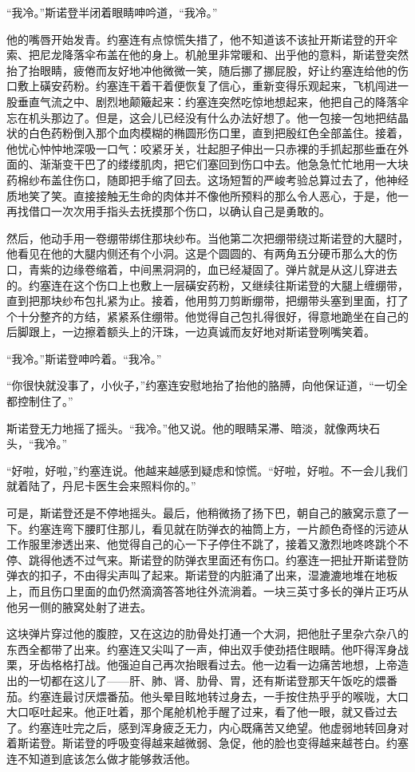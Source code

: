     “我冷。”斯诺登半闭着眼睛呻吟道，“我冷。”

    他的嘴唇开始发青。约塞连有点惊慌失措了，他不知道该不该扯开斯诺登的开伞索、把尼龙降落伞布盖在他的身上。机舱里非常暖和、出乎他的意料，斯诺登突然抬了抬眼睛，疲倦而友好地冲他微微一笑，随后挪了挪屁股，好让约塞连给他的伤口敷上磺安药粉。约塞连干着干着便恢复了信心，重新变得乐观起来，飞机闯进一股垂直气流之中、剧烈地颠簸起来：约塞连突然吃惊地想起来，他把自己的降落伞忘在机头那边了。但是，这会儿已经没有什么办法好想了。他一包接一包地把结晶状的白色药粉倒入那个血肉模糊的椭圆形伤口里，直到把殷红色全部盖住。接着，他忧心忡忡地深吸一口气：咬紧牙关，壮起胆子伸出一只赤裸的手抓起那些垂在外面的、渐渐变干巴了的缕缕肌肉，把它们塞回到伤口中去。他急急忙忙地用一大块药棉纱布盖住伤口，随即把手缩了回去。这场短暂的严峻考验总算过去了，他神经质地笑了笑。直接接触无生命的肉体并不像他所预料的那么令人恶心，于是，他一再找借口一次次用手指头去抚摸那个伤口，以确认自己是勇敢的。

    然后，他动手用一卷绷带绑住那块纱布。当他第二次把绷带绕过斯诺登的大腿时，他看见在他的大腿内侧还有个小洞。这是个圆圆的、有两角五分硬币那么大的伤口，青紫的边缘卷缩着，中间黑洞洞的，血已经凝固了。弹片就是从这儿穿进去的。约塞连在这个伤口上也敷上一层磺安药粉，又继续往斯诺登的大腿上缠绷带，直到把那块纱布包扎紧为止。接着，他用剪刀剪断绷带，把绷带头塞到里面，打了个十分整齐的方结，紧紧系住绷带。他觉得自己包扎得很好，得意地跪坐在自己的后脚跟上，一边擦着额头上的汗珠，一边真诚而友好地对斯诺登咧嘴笑着。

    “我冷。”斯诺登呻吟着。“我冷。”

    “你很快就没事了，小伙子，”约塞连安慰地抬了抬他的胳膊，向他保证道，“一切全都控制住了。”

    斯诺登无力地摇了摇头。“我冷。”他又说。他的眼睛呆滞、暗淡，就像两块石头，“我冷。”

    “好啦，好啦，”约塞连说。他越来越感到疑虑和惊慌。“好啦，好啦。不一会儿我们就着陆了，丹尼卡医生会来照料你的。”

    可是，斯诺登还是不停地摇头。最后，他稍微扬了扬下巴，朝自己的腋窝示意了一下。约塞连弯下腰盯住那儿，看见就在防弹衣的袖筒上方，一片颜色奇怪的污迹从工作服里渗透出来、他觉得自己的心一下子停住不跳了，接着又激烈地咚咚跳个不停、跳得他透不过气来。斯诺登的防弹衣里面还有伤口。约塞连一把扯开斯诺登防弹衣的扣子，不由得尖声叫了起来。斯诺登的内脏涌了出来，湿漉漉地堆在地板上，而且伤口里面的血仍然滴滴答答地往外流淌着。一块三英寸多长的弹片正巧从他另一侧的腋窝处射了进去。

    这块弹片穿过他的腹腔，又在这边的肋骨处打通一个大洞，把他肚子里杂六杂八的东西全都带了出来。约塞连又尖叫了一声，伸出双手使劲捂住眼睛。他吓得浑身战栗，牙齿格格打战。他强迫自己再次抬眼看过去。他一边看一边痛苦地想，上帝造出的一切都在这儿了——肝、肺、肾、肋骨、胃，还有斯诺登那天午饭吃的煨番茄。约塞连最讨厌煨番茄。他头晕目眩地转过身去，一手按住热乎乎的喉咙，大口大口呕吐起来。他正吐着，那个尾舱机枪手醒了过来，看了他一眼，就又昏过去了。约塞连吐完之后，感到浑身疲乏无力，内心既痛苦又绝望。他虚弱地转回身对着斯诺登。斯诺登的呼吸变得越来越微弱、急促，他的脸也变得越来越苍白。约塞连不知道到底该怎么做才能够救活他。

